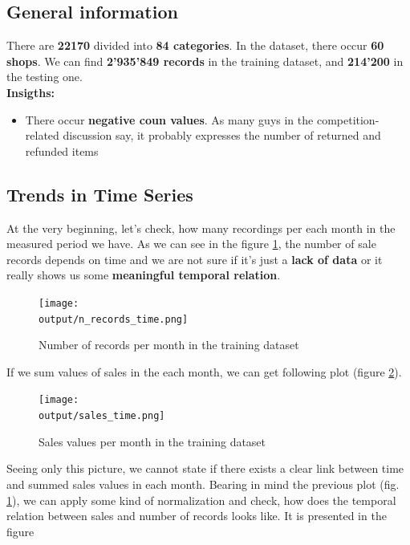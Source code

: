 \documentclass[12pt,twoside,a4paper]{memoir}
\def \output {../output}
\begin{document}
\subsection{General information}
There are  \textbf{22170} divided into \textbf{84 categories}. In the dataset, there occur \textbf{60 shops}. We can find \textbf{2'935'849 records} in the training dataset, and \textbf{214'200} in the testing one.
\newline \\
\textbf{Insigths:}
\begin{itemize}
\item There occur \textbf{negative coun values}. As many guys in the competition-related discussion say, it probably expresses the number of returned and refunded items
\end{itemize}

\subsection{Trends in Time Series}

At the very beginning, let's check, how many recordings per each month in the measured period we have. As we can see in the figure \ref{fig:nRecords}, the number of sale records depends on time and we are not sure if it's just a \textbf{lack of data} or it really shows us some \textbf{meaningful temporal relation}.

	\begin{figure}[ht]
		\centering
		\texttt{[image: \\output/n\_records\_time.png]}
		\caption{Number of records per month in the training dataset}
	\label{fig:nRecords}
	\end{figure}

If we sum values of sales in the each month, we can get following plot (figure \ref{fig:salesValues}).

	\begin{figure}[ht]
		\centering
		\texttt{[image: \\output/sales\_time.png]}
		\caption{Sales values per month in the training dataset}
	\label{fig:salesValues}
	\end{figure}
Seeing only this picture, we cannot state if there exists a clear link between time and summed sales values in each month. Bearing in mind the previous plot (fig. \ref{fig:nRecords}), we can apply some kind of normalization and check, how does the temporal relation between sales and number of records looks like. It is presented in the figure 


\printbibliography
\end{document}
